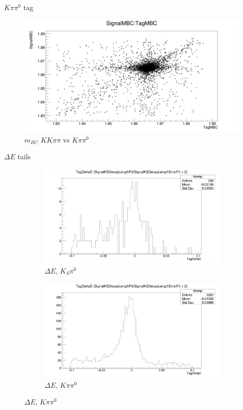 \documentclass{beamer}
\begin{document}
\begin{frame}{$K\pi\pi^0$ tag}
  \begin{figure}
    \centering
    \includegraphics[width=\textwidth]{Kpipi0DoubleTag_ScatterPlotMBC.png}
    \caption{$m_{BC}$ $KK\pi\pi$ vs $K\pi\pi^0$}
  \end{figure}
\end{frame}

\begin{frame}{$\Delta E$ tails}
  \begin{figure}
    \centering
    \begin{subfigure}{0.5\textwidth}
      \centering
      \includegraphics[width=\textwidth]{KSpi0DoubleTag_TagDeltaE.png}
      \caption{$\Delta E$, $K_S\pi^0$}
    \end{subfigure}%
    \begin{subfigure}{0.5\textwidth}
      \centering
      \includegraphics[width=\textwidth]{Kpipi0DoubleTag_TagDeltaE.png}
      \caption{$\Delta E$, $K\pi\pi^0$}
    \end{subfigure}
  \end{figure}
\end{frame}
\end{document}

